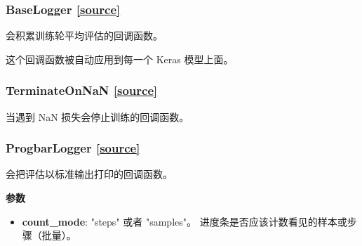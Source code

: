 \subsubsection{BaseLogger {\href{https://github.com/keras-team/keras/blob/master/keras/callbacks.py\#L201}{{[}source{]}}}}

\begin{Shaded}
\begin{Highlighting}[]
\end{Highlighting}
\end{Shaded}

会积累训练轮平均评估的回调函数。

这个回调函数被自动应用到每一个 Keras 模型上面。




\subsubsection{TerminateOnNaN {\href{https://github.com/keras-team/keras/blob/master/keras/callbacks.py\#L230}{{[}source{]}}}}

\begin{Shaded}
\begin{Highlighting}[]
\end{Highlighting}
\end{Shaded}

当遇到 NaN 损失会停止训练的回调函数。




\subsubsection{ProgbarLogger {\href{https://github.com/keras-team/keras/blob/master/keras/callbacks.py\#L246}{{[}source{]}}}}

\begin{Shaded}
\begin{Highlighting}[]
\OperatorTok{=}\NormalTok{)}
\end{Highlighting}
\end{Shaded}

会把评估以标准输出打印的回调函数。

\textbf{参数}

\begin{itemize}
\tightlist
\item
  \textbf{count\_mode}: "steps" 或者 "samples"。
  进度条是否应该计数看见的样本或步骤（批量）。
\end{itemize}

